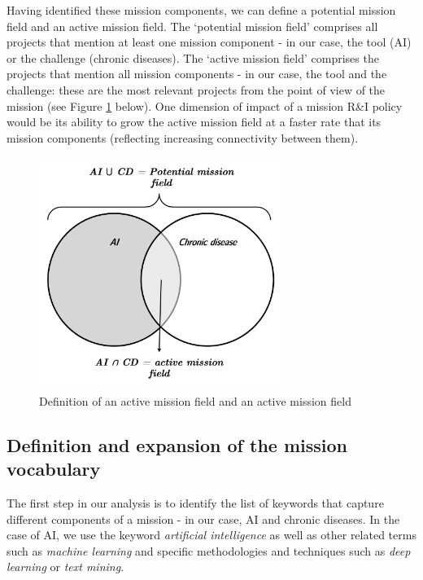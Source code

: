 \documentclass[11pt]{article}
\begin{document}
Having identified these mission components, we can define a potential mission field and an active mission field. The `potential mission field' comprises all projects that mention at least one mission component - in our case, the tool (AI) or the challenge (chronic diseases). The `active mission field’ comprises the projects that mention all mission components - in our case, the tool and the challenge: these are the most relevant projects from the point of view of the mission (see Figure \ref{fig:venn_diagram} below). One dimension of impact of a mission R\&I policy would be its ability to grow the active mission field at a faster rate that its mission components (reflecting increasing connectivity between them).

\begin{figure}[!ht]
    \centering
    \includegraphics[width=0.7\textwidth]{figures/fig_4_venn.png}
    \caption{Definition of an active mission field and an active mission field}
    \label{fig:venn_diagram}
\end{figure}

\subsection{Definition and expansion of the mission vocabulary}
\label{subsec:vocabulary}

The first step in our analysis is to identify the list of keywords that capture different components of a mission - in our case, AI and chronic diseases. In the case of AI, we use the keyword \emph{artificial intelligence} as well as other related terms such as \emph{machine learning} and specific methodologies and techniques such as \emph{deep learning} or \emph{text mining}.
\end{document}
